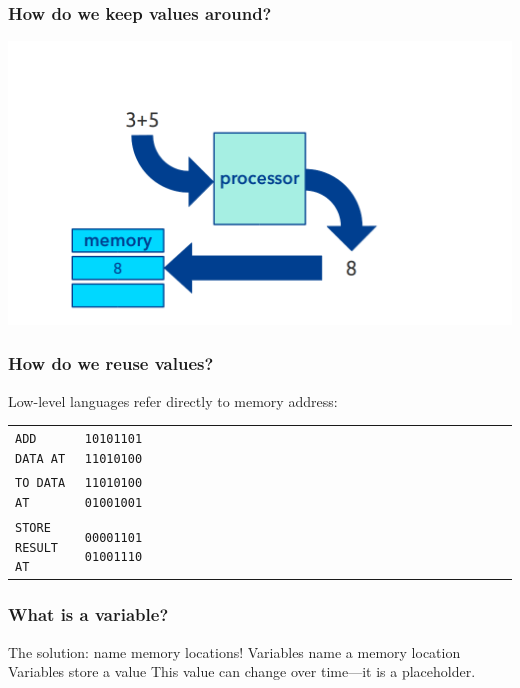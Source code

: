 \documentclass[11pt]{beamer}
\begin{document}
\begin{frame}
  \frametitle{How do we keep values around?}
  \includegraphics[width=\textwidth]{./img/computer-memory-0.png}
\end{frame}

\begin{frame}
  \frametitle{How do we reuse values?}
  \Enlarge

  \begin{itemize}
  \myitem  Low-level languages refer directly to memory address:
  \begin{tabular}{*{27}{l}}
    \texttt{ADD DATA AT}     & \texttt{10101101 11010100} \\
    \texttt{TO DATA AT}      & \texttt{11010100 01001001} \\
    \texttt{STORE RESULT AT} & \texttt{00001101 01001110} \\
  \end{tabular}
  \end{itemize}
\end{frame}

\begin{frame}
  \frametitle{What is a \textbf{variable}?}
  \Enlarge

  \begin{itemize}
  \myitem  The solution:  \textcolor{CS101GradBot}{name memory locations!}
  \myitem  Variables name a memory location
  \myitem  Variables store a value
  \myitem  This value can change over time---it is a placeholder.
  \end{itemize}
\end{frame}
\end{document}
